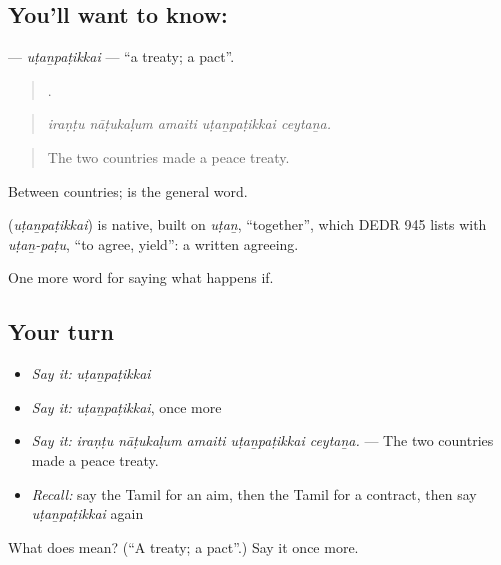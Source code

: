 \subsection*{You'll want to know: }
\textbf{} — \emph{uṭaṉpaṭikkai} — \textquotedblleft{}a treaty; a pact\textquotedblright{}.

\begin{quote}
    .
\end{quote}

\begin{quote}
\emph{iraṇṭu nāṭukaḷum amaiti uṭaṉpaṭikkai ceytaṉa.}
\end{quote}

\begin{quote}
The two countries made a peace treaty.
\end{quote}

Between countries;  is the general word.

\begin{cousinweb}
\textbf{} (\emph{uṭaṉpaṭikkai}) is native, built on \emph{uṭaṉ}, \textquotedblleft{}together\textquotedblright{}, which DEDR 945 lists with \emph{uṭaṉ-paṭu}, \textquotedblleft{}to agree, yield\textquotedblright{}: a written agreeing.
\end{cousinweb}

\begin{grammarlens}[title={What you've built}]
One more word for saying what happens if.
\end{grammarlens}

\subsection*{Your turn}
\begin{itemize}
\raggedright
  \item \emph{Say it:} \emph{uṭaṉpaṭikkai}
  \item \emph{Say it:} \emph{uṭaṉpaṭikkai}, once more
  \item \emph{Say it:} \emph{iraṇṭu nāṭukaḷum amaiti uṭaṉpaṭikkai ceytaṉa.} — The two countries made a peace treaty.
  \item \emph{Recall:} say the Tamil for an aim, then the Tamil for a contract, then say \emph{uṭaṉpaṭikkai} again
\end{itemize}

\begin{tcolorbox}[breakable,colback=teal!4,colframe=teal!35!black,title={Before you move on}]
What does  mean? (\textquotedblleft{}A treaty; a pact\textquotedblright{}.) Say it once more.
\end{tcolorbox}
